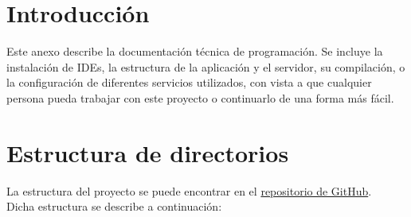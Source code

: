 
\section{Introducción}

Este anexo describe la documentación técnica de programación.
Se incluye la instalación de IDEs, la estructura de la aplicación y el servidor, su compilación, o la configuración de diferentes servicios utilizados, con vista a que cualquier persona pueda trabajar con este proyecto o continuarlo de una forma más fácil.



\section{Estructura de directorios}

La estructura del proyecto se puede encontrar en el \href{https://github.com/fmv1001/LocalStream}{repositorio de GitHub}.\\
Dicha estructura se describe a continuación:

